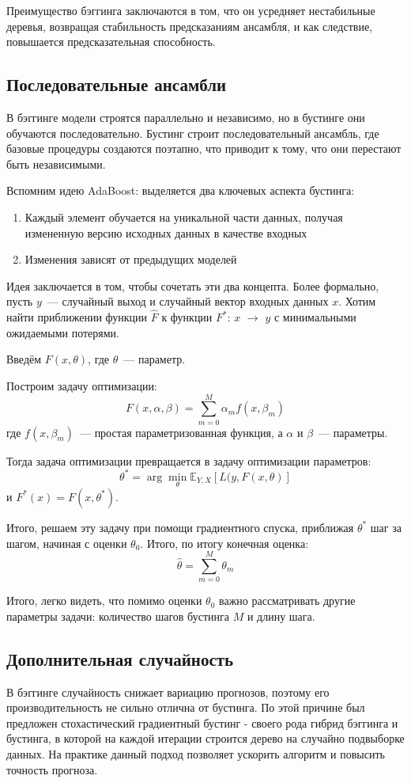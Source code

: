 Преимущество бэггинга заключаются в том, что он усредняет нестабильные деревья, возвращая стабильность предсказаниям ансамбля, и как следствие, повышается предсказательная способность.

\subsection*{Последовательные ансамбли}
В бэггинге модели строятся параллельно и независимо, но в бустинге они обучаются последовательно. Бустинг строит последовательный ансамбль, где базовые процедуры создаются поэтапно, что приводит к тому, что они перестают быть независимыми.

Вспомним идею AdaBoost: выделяется два ключевых аспекта бустинга:
\begin{enumerate}
    \item Каждый элемент обучается на уникальной части данных, получая измененную версию исходных данных в качестве входных
    \item Изменения зависят от предыдущих моделей
\end{enumerate}

Идея заключается в том, чтобы сочетать эти два концепта. Более формально, пусть $y$~--- случайный выход и случайный вектор входных данных $x$.
Хотим найти приближении функции $\hat{F}$ к функции $F^*$: $x$ $\rightarrow$ $y$ с минимальными ожидаемыми потерями.

Введём $F(x, \theta)$, где $\theta$~--- параметр.

Построим задачу оптимизации:
$$F(x, \alpha, \beta) = \sum_{m = 0}^M \alpha_m f(x, \beta_m)$$ где $f(x, \beta_m)$~--- простая параметризованная функция, а $\alpha$ и $\beta$~--- параметры.

Тогда задача оптимизации превращается в задачу оптимизации параметров:
$$\theta^* = \arg \min_{\theta} \mathbb{E}_{Y, X} [L(y, F(x, \theta)]$$
и $F^*(x)=F(x, \theta^*)$.

Итого, решаем эту задачу при помощи градиентного спуска, приближая $\theta^*$ шаг за шагом, начиная с оценки $\theta_0$. Итого, по итогу конечная оценка:
$$\hat{\theta} = \sum_{m=0}^M \theta_m$$

Итого, легко видеть, что помимо оценки $\theta_0$ важно рассматривать другие параметры задачи: количество шагов бустинга $M$ и длину шага.

\subsection*{Дополнительная случайность}
В бэггинге случайность снижает вариацию прогнозов, поэтому его производительность не сильно отлична от бустинга. По этой причине был предложен стохастический градиентный бустинг - своего рода гибрид бэггинга и бустинга, в которой на каждой итерации строится дерево на случайно подвыборке данных. На практике данный подход позволяет ускорить алгоритм и повысить точность прогноза.

